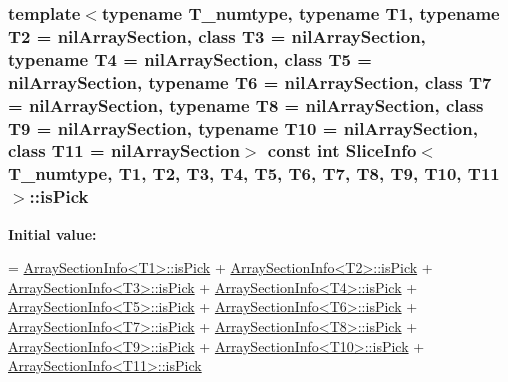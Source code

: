\subsubsection[{is\+Pick}]{\setlength{\rightskip}{0pt plus 5cm}template$<$typename T\+\_\+numtype, typename T1, typename T2 = nil\+Array\+Section, class T3  = nil\+Array\+Section, typename T4  = nil\+Array\+Section, class T5  = nil\+Array\+Section, typename T6  = nil\+Array\+Section, class T7  = nil\+Array\+Section, typename T8  = nil\+Array\+Section, class T9  = nil\+Array\+Section, typename T10  = nil\+Array\+Section, class T11  = nil\+Array\+Section$>$ const int {\bf Slice\+Info}$<$ T\+\_\+numtype, T1, T2, T3, T4, T5, T6, T7, T8, T9, T10, T11 $>$\+::is\+Pick\hspace{0.3cm}{\ttfamily [static]}}\label{classSliceInfo_ae58323255323aec3392d4ef776060173}
{\bfseries Initial value\+:}
\begin{DoxyCode}
= \hyperlink{classArraySectionInfo}{ArraySectionInfo<T1>::isPick}
                      + \hyperlink{classArraySectionInfo}{ArraySectionInfo<T2>::isPick}
                      + \hyperlink{classArraySectionInfo}{ArraySectionInfo<T3>::isPick}
                      + \hyperlink{classArraySectionInfo}{ArraySectionInfo<T4>::isPick}
                      + \hyperlink{classArraySectionInfo}{ArraySectionInfo<T5>::isPick}
                      + \hyperlink{classArraySectionInfo}{ArraySectionInfo<T6>::isPick}
                      + \hyperlink{classArraySectionInfo}{ArraySectionInfo<T7>::isPick}
                      + \hyperlink{classArraySectionInfo}{ArraySectionInfo<T8>::isPick}
                      + \hyperlink{classArraySectionInfo}{ArraySectionInfo<T9>::isPick}
                      + \hyperlink{classArraySectionInfo}{ArraySectionInfo<T10>::isPick}
                      + \hyperlink{classArraySectionInfo}{ArraySectionInfo<T11>::isPick}
\end{DoxyCode}
\hypertarget{classSliceInfo_acab30466f2e1e0506c1a9caddc18dd5f}{}
